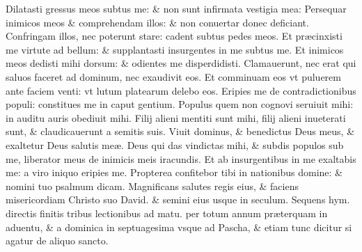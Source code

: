 \documentclass[a5paper,10pt]{book}
\def\ae{æ}
\begin{document}
\begin{multicols*}{2}
\newline \color{red} D\color{black}ilatasti gressus meos subtus me: \& non sunt infirmata vestigia mea:
\newline \color{red} P\color{black}ersequar inimicos meos \& comprehendam illos: \& non conuertar donec deficiant.
\newline \color{red} C\color{black}onfringam illos, nec poterunt stare: cadent subtus pedes meos.
\newline \color{red} E\color{black}t pr\ae cinxisti me virtute ad bellum: \& supplantasti insurgentes in me subtus me.
\newline \color{red} E\color{black}t inimicos meos dedisti mihi dorsum: \& odientes me disperdidisti.
\newline \color{red} C\color{black}lamauerunt, nec erat qui saluos faceret ad dominum, nec exaudivit eos.
\newline \color{red} E\color{black}t comminuam eos vt puluerem ante faciem venti: vt lutum platearum delebo eos.%
\newline \color{red} E\color{black}ripies me de contradictionibus populi: constitues me in caput gentium.
\newline \color{red} P\color{black}opulus quem non cognovi seruiuit mihi: in auditu auris obediuit mihi.
\newline \color{red} F\color{black}ilij alieni mentiti sunt mihi, filij alieni inueterati sunt, \& claudicauerunt a semitis suis.
\newline \color{red} V\color{black}iuit dominus, \& benedictus Deus meus, \& exaltetur Deus salutis me\ae .
\newline \color{red} D\color{black}eus qui das vindictas mihi, \& subdis populos sub me, liberator meus de inimicis meis iracundis.
\newline \color{red} E\color{black}t ab insurgentibus in me exaltabis me: a viro iniquo eripies me.
\newline \color{red} P\color{black}ropterea confitebor tibi in nationibus domine: \& nomini tuo psalmum dicam.
\newline \color{red} M\color{black}agnificans salutes regis eius, \& faciens misericordiam Christo suo David. \& semini eius usque in seculum.
\newline {} \color{red} Sequens hym. directis %
finitis tribus lectionibus ad matu. per totum annum pr\ae terquam in aduentu, \& a dominica in septuagesima vsque ad Pascha, \& etiam tunc dicitur si agatur de aliquo sancto. \color{black}

\end{multicols*}
\end{document}
